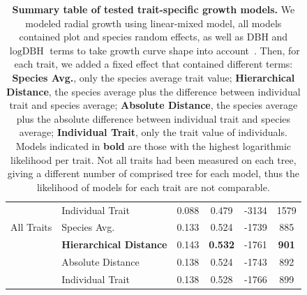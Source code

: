 \begin{table}[!pt]
\begin{center}
\begin{tabular}{llcccc}
		            & Individual Trait & 0.088 & 0.479 & -3134 & 1579 \\
		  \cline{2-6}
		  All Traits & Species Avg. & 0.133 & 0.524 & -1739 & 885 \\ 
		             & \textbf{Hierarchical Distance} & 0.143 & \textbf{0.532} & -1761 & \textbf{901} \\
		             & Absolute Distance & 0.138 & 0.524 & -1743 & 892 \\
		             & Individual Trait & 0.138 & 0.528 & -1766 & 899 \\ 
		   \hline
		\end{tabular}
		\caption{\textbf{Summary table of tested trait-specific growth models.} We modeled radial growth using linear-mixed model, all models contained plot and species random effects, as well as DBH and $\log\text{DBH}$ terms to take growth curve shape into account~\citep{herault_functional_2011}. Then, for each trait, we added a fixed effect that contained different terms: \textbf{Species Avg.}, only the species average trait value; \textbf{Hierarchical Distance}, the species average plus the difference between individual trait and species average; \textbf{Absolute Distance}, the species average plus the absolute difference between individual trait and species average; \textbf{Individual Trait}, only the trait value of individuals. Models indicated in \textbf{bold} are those with the highest logarithmic likelihood per trait. Not all traits had been measured on each tree, giving a different number of comprised tree for each model, thus the likelihood of models for each trait are not comparable.}
		\label{tab:growth_mod}
	\end{center}
\end{table}
